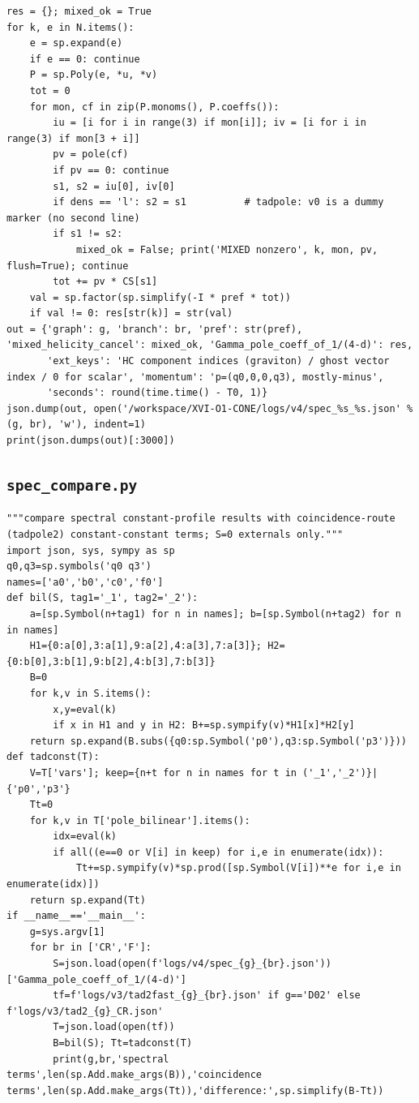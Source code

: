 \documentclass[10pt]{article}
\begin{document}
\begin{lstlisting}
res = {}; mixed_ok = True
for k, e in N.items():
    e = sp.expand(e)
    if e == 0: continue
    P = sp.Poly(e, *u, *v)
    tot = 0
    for mon, cf in zip(P.monoms(), P.coeffs()):
        iu = [i for i in range(3) if mon[i]]; iv = [i for i in range(3) if mon[3 + i]]
        pv = pole(cf)
        if pv == 0: continue
        s1, s2 = iu[0], iv[0]
        if dens == 'l': s2 = s1          # tadpole: v0 is a dummy marker (no second line)
        if s1 != s2:
            mixed_ok = False; print('MIXED nonzero', k, mon, pv, flush=True); continue
        tot += pv * CS[s1]
    val = sp.factor(sp.simplify(-I * pref * tot))
    if val != 0: res[str(k)] = str(val)
out = {'graph': g, 'branch': br, 'pref': str(pref), 'mixed_helicity_cancel': mixed_ok, 'Gamma_pole_coeff_of_1/(4-d)': res,
       'ext_keys': 'HC component indices (graviton) / ghost vector index / 0 for scalar', 'momentum': 'p=(q0,0,0,q3), mostly-minus',
       'seconds': round(time.time() - T0, 1)}
json.dump(out, open('/workspace/XVI-O1-CONE/logs/v4/spec_%s_%s.json' % (g, br), 'w'), indent=1)
print(json.dumps(out)[:3000])
\end{lstlisting}
\subsection{\texttt{spec\_compare.py}}
\begin{lstlisting}
"""compare spectral constant-profile results with coincidence-route (tadpole2) constant-constant terms; S=0 externals only."""
import json, sys, sympy as sp
q0,q3=sp.symbols('q0 q3')
names=['a0','b0','c0','f0']
def bil(S, tag1='_1', tag2='_2'):
    a=[sp.Symbol(n+tag1) for n in names]; b=[sp.Symbol(n+tag2) for n in names]
    H1={0:a[0],3:a[1],9:a[2],4:a[3],7:a[3]}; H2={0:b[0],3:b[1],9:b[2],4:b[3],7:b[3]}
    B=0
    for k,v in S.items():
        x,y=eval(k)
        if x in H1 and y in H2: B+=sp.sympify(v)*H1[x]*H2[y]
    return sp.expand(B.subs({q0:sp.Symbol('p0'),q3:sp.Symbol('p3')}))
def tadconst(T):
    V=T['vars']; keep={n+t for n in names for t in ('_1','_2')}|{'p0','p3'}
    Tt=0
    for k,v in T['pole_bilinear'].items():
        idx=eval(k)
        if all((e==0 or V[i] in keep) for i,e in enumerate(idx)):
            Tt+=sp.sympify(v)*sp.prod([sp.Symbol(V[i])**e for i,e in enumerate(idx)])
    return sp.expand(Tt)
if __name__=='__main__':
    g=sys.argv[1]
    for br in ['CR','F']:
        S=json.load(open(f'logs/v4/spec_{g}_{br}.json'))['Gamma_pole_coeff_of_1/(4-d)']
        tf=f'logs/v3/tad2fast_{g}_{br}.json' if g=='D02' else f'logs/v3/tad2_{g}_CR.json'
        T=json.load(open(tf))
        B=bil(S); Tt=tadconst(T)
        print(g,br,'spectral terms',len(sp.Add.make_args(B)),'coincidence terms',len(sp.Add.make_args(Tt)),'difference:',sp.simplify(B-Tt))
\end{lstlisting}
\end{document}
